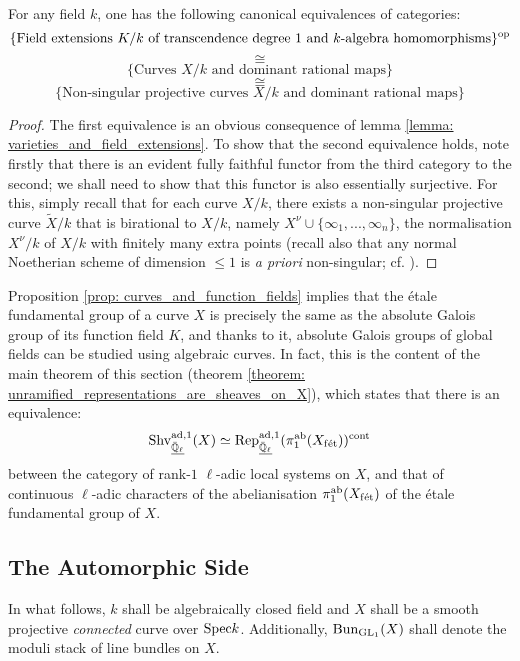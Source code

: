         \begin{proposition} \label{prop: curves_and_function_fields}
            \cite[\href{https://stacks.math.columbia.edu/tag/0BY1}{Tag 0BY1}]{stacks} For any field $k$, one has the following canonical equivalences of categories:
                $$\{\text{Field extensions $K/k$ of transcendence degree $1$ and $k$-algebra homomorphisms}\}^{\mathrm{op}}$$
                $$\cong$$
                $$\{\text{Curves $X/k$ and dominant rational maps}\}$$
                $$\cong$$
                $$\{\text{Non-singular projective curves $X/k$ and dominant rational maps}\}$$
        \end{proposition}
            \begin{proof}
                The first equivalence is an obvious consequence of lemma \ref{lemma: varieties_and_field_extensions}. To show that the second equivalence holds, note firstly that there is an evident fully faithful functor from the third category to the second; we shall need to show that this functor is also essentially surjective. For this, simply recall that for each curve $X/k$, there exists a non-singular projective curve $\tilde{X}/k$ that is birational to $X/k$, namely $X^{\nu} \cup \{\infty_1, ..., \infty_n\}$, the normalisation $X^{\nu}/k$ of $X/k$ with finitely many extra points (recall also that any normal Noetherian scheme of dimension $\leq 1$ is \textit{a priori} non-singular; cf. \cite[\href{https://stacks.math.columbia.edu/tag/0BX2}{Tag 0BX2}]{stacks}).
            \end{proof}
        Proposition \ref{prop: curves_and_function_fields} implies that the \'etale fundamental group of a curve $X$ is precisely the same as the absolute Galois group of its function field $K$, and thanks to it, absolute Galois groups of global fields can be studied using algebraic curves. In fact, this is the content of the main theorem of this section (theorem \ref{theorem: unramified_representations_are_sheaves_on_X}), which states that there is an equivalence:
            $$\mathrm{Shv}^{\mathrm{ad}, 1}_{\underline{\bar{\mathbb{Q}}_{\ell}}}(X) \simeq \mathrm{Rep}^{\mathrm{ad}, 1}_{\underline{\bar{\mathbb{Q}}_{\ell}}}(\pi_1^{\mathrm{ab}}(X_{\mathrm{f\acute{e}t}}))^{\mathrm{cont}}$$
        between the category of rank-$1$ $\ell$-adic local systems on $X$, and that of continuous $\ell$-adic characters of the abelianisation $\pi_1^{\mathrm{ab}}(X_{\mathrm{f\acute{e}t}})$ of the \'etale fundamental group of $X$. 
    
    \subsection{The Automorphic Side}
        \begin{convention}
            In what follows, $k$ shall be algebraically closed field and $X$ shall be a smooth projective \textit{connected} curve over $\mathrm{Spec} k$. Additionally, $\mathrm{Bun}_{\operatorname{GL}_1}(X)$ shall denote the moduli stack of line bundles on $X$.
        \end{convention}
    
